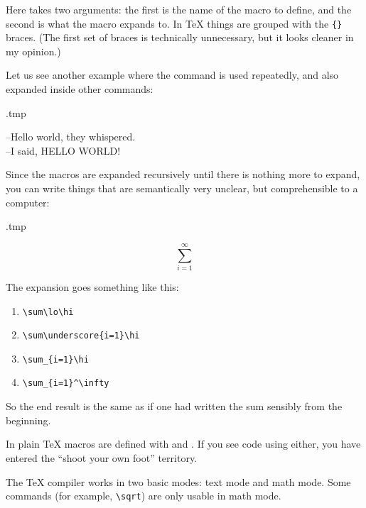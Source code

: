 Here  takes two arguments:
the first is the name of the macro to define, and the second is what the macro expands to.
In \TeX{} things are grouped with the \verb|{}| braces.
(The first set of braces is technically unnecessary, but it looks cleaner in my opinion.)

Let us see another example where the command is used repeatedly,
and also expanded inside other commands:
\begin{VerbatimOut}{\jobname.tmp}
\newcommand{\hello}{Hello world}

--\hello, they whispered.\\
--I said, \MakeUppercase{\hello}!
\end{VerbatimOut}
\ShowExample

Since the macros are expanded recursively until there is nothing more to expand,
you can write things that are semantically very unclear,
but comprehensible to a computer:
\begin{VerbatimOut}{\jobname.tmp}
\newcommand{\hi}{^\infty}
\newcommand{\underscore}{_}
\newcommand{\lo}{\underscore{i=1}}

\[ \sum\lo\hi \]
\end{VerbatimOut}
\ShowExample
%
The expansion goes something like this:
\begin{enumerate}
    \item \verb|\sum\lo\hi|
    \item \verb|\sum\underscore{i=1}\hi|
    \item \verb|\sum_{i=1}\hi|
    \item \verb|\sum_{i=1}^\infty|
\end{enumerate}
So the end result is the same as if one had written the sum sensibly from the beginning.



\begin{warning}
In plain \TeX{} macros are defined with  and .
If you see code using either,
you have entered the ``shoot your own foot'' territory.\footnotemark
\end{warning}


The \TeX{} compiler works in two basic modes: text mode and math mode.
Some commands (for example, \verb|\sqrt|) are only usable in math mode.

